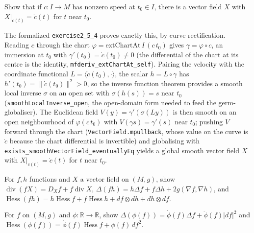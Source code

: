 \begin{remark}
  \label{rem:pet-ch2-ex-4}
  \leanok
  Show that if $c:I\to M$ has nonzero speed at $t_0\in I$, there is a vector
  field $X$ with $X|_{c(t)}=\dot c(t)$ for $t$ near $t_0$.

  The formalized \texttt{exercise2\_5\_4} proves exactly this, by curve
  rectification. Reading $c$ through the chart $\varphi=\mathrm{extChartAt}\,I\,(c\,t_0)$
  gives $\gamma=\varphi\circ c$, an immersion at $t_0$ with $\gamma'(t_0)=\dot c(t_0)\ne0$
  (the differential of the chart at its centre is the identity,
  \texttt{mfderiv\_extChartAt\_self}). Pairing the velocity with the coordinate
  functional $L=\langle\dot c(t_0),\cdot\rangle$, the scalar $h=L\circ\gamma$ has
  $h'(t_0)=\lVert\dot c(t_0)\rVert^2>0$, so the inverse function theorem provides a
  smooth local inverse $\sigma$ on an open set with $\sigma(h(s))=s$ near $t_0$
  (\texttt{smoothLocalInverse\_open}, the open-domain form needed to feed the
  germ-globaliser). The Euclidean field $V(y)=\gamma'(\sigma(L y))$ is then smooth on
  an open neighbourhood of $\varphi(c\,t_0)$ with $V(\gamma s)=\gamma'(s)$ near $t_0$;
  pushing $V$ forward through the chart (\texttt{VectorField.mpullback}, whose value on
  the curve is $\dot c$ because the chart differential is invertible) and globalising
  with \texttt{exists\_smoothVectorField\_eventuallyEq} yields a global smooth vector
  field $X$ with $X|_{c(t)}=\dot c(t)$ for $t$ near $t_0$.
\end{remark}

\begin{remark}
  \label{rem:pet-ch2-ex-5}
  \leanok
  For $f,h$ functions and $X$ a vector field on $(M,g)$, show
  $\operatorname{div}(fX)=D_Xf+f\operatorname{div}X$,
  $\Delta(fh)=h\Delta f+f\Delta h+2g(\nabla f,\nabla h)$, and
  $\operatorname{Hess}(fh)=h\operatorname{Hess}f+f\operatorname{Hess}h+df\otimes dh+dh\otimes df$.
\end{remark}

\begin{remark}
  \label{rem:pet-ch2-ex-6}
  \leanok
  For $f$ on $(M,g)$ and $\phi:\mathbb{R}\to\mathbb{R}$, show
  $\Delta(\phi(f))=\dot\phi(f)\Delta f+\ddot\phi(f)|df|^2$ and
  $\operatorname{Hess}(\phi(f))=\dot\phi(f)\operatorname{Hess}f+\ddot\phi(f)\,df^2$.
\end{remark}

